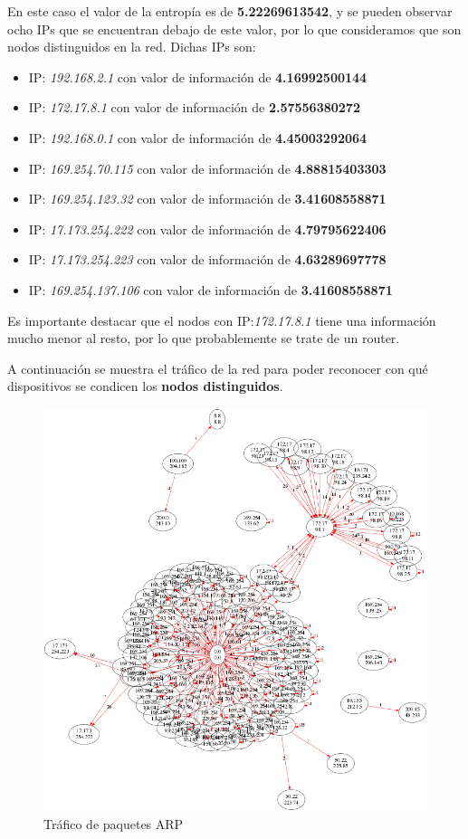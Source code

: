 En este caso el valor de la entropía es de \textbf{5.22269613542}, y se pueden observar ocho IPs que se encuentran debajo de este valor, por lo que consideramos que son nodos distinguidos en la red. Dichas IPs son:
\begin{itemize}
\item IP: \textit{192.168.2.1} con valor de información de \textbf{4.16992500144}
\item IP: \textit{172.17.8.1} con valor de información de \textbf{2.57556380272}
\item IP: \textit{192.168.0.1} con valor de información de \textbf{4.45003292064}
\item IP: \textit{169.254.70.115} con valor de información de \textbf{4.88815403303}
\item IP: \textit{169.254.123.32} con valor de información de \textbf{3.41608558871}
\item IP: \textit{17.173.254.222} con valor de información de \textbf{4.79795622406}
\item IP: \textit{17.173.254.223} con valor de información de \textbf{4.63289697778}
\item IP: \textit{169.254.137.106} con valor de información de \textbf{3.41608558871}
\end{itemize}

Es importante destacar que el nodos con IP:\textit{172.17.8.1} tiene una información mucho menor al resto, por lo que probablemente se trate de un router.

A continuación se muestra el tráfico de la red para poder reconocer con qué dispositivos se condicen los \textbf{nodos distinguidos}.

\begin{figure}[H]
       \centering
       \includegraphics[width=1\textwidth]{../resultados/McDonalds/network.png}
       \caption{Tráfico de paquetes ARP}
       \label{red-hogarena-arp-traffic}
\end{figure}

